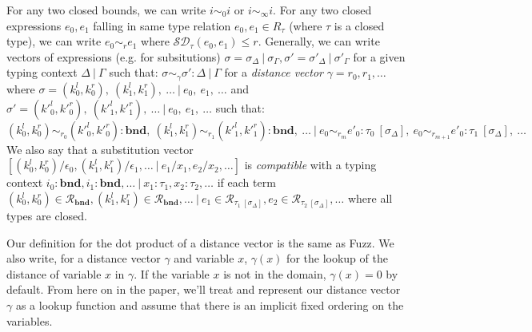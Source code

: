For any two closed bounds, we can write $i \sim_0 i$ or $i \sim_{\infty} i$. 
For any two closed expressions $e_0, e_1$ falling in same type relation $e_0,
e_1 \in R_\tau$ (where $\tau$ is a closed type), we can write $e_0 \sim_r e_1$
where $\mathcal{SD}_{\tau}(e_0, e_1) \leq r$. 
Generally, we can write vectors of expressions (e.g. for subsitutions) $\sigma =
\sigma_{\Delta} \ | \ \sigma_{\Gamma}, \sigma' = \sigma'_{\Delta} \ | \
\sigma'_{\Gamma}$
for a given typing context $\Delta \ | \ \Gamma$ such that: $\sigma \sim_{\gamma} \sigma'
: \Delta \ | \ \Gamma$ for a \textit{distance vector}
$\gamma = r_0, r_1, \ldots$
where
$\sigma = (k^l_0, k^r_0),~(k^l_1, k^r_1),~\ldots \ | \ e_0,~e_1,~\ldots$ 
and 
$\sigma' = (k'^l_0, k'^r_0),~(k'^l_1, k'^r_1),~\ldots \ | \ e_0,~e_1,~\ldots$ 
such that:
$$
(k^l_0, k^r_0) \sim_{r_0} (k'^l_0, k'^r_0) : \mathbf{bnd},~(k^l_1, k^r_1) \sim_{r_1} (k'^l_1, k'^r_1) : \mathbf{bnd},~\ldots \
| \ e_0 \sim_{r_m} e'_0 :
\tau_0~[\sigma_{\Delta}],~e_0 \sim_{r_{m+1}} e'_0 :
\tau_1~[\sigma_{\Delta}],~\ldots
$$
We also say that a substitution vector 
$[(k^l_0, k^r_0) / \epsilon_0, (k^l_1, k^r_1) / \epsilon_1, \ldots \ | \ e_1/x_1, e_2/x_2, \ldots]$ 
is \textit{compatible} with a typing context 
$i_0 : \mathbf{bnd}, i_1 : \mathbf{bnd}, \ldots \ | \ x_1 : \tau_1, x_2 : \tau_2, \ldots$
if each term 
$(k^l_0, k^r_0) \in \mathcal{R}_{\mathbf{bnd}}, 
(k^l_1, k^r_1) \in \mathcal{R}_{\mathbf{bnd}}, 
\ldots \ | 
\ e_1 \in \mathcal{R}_{\tau_1~[\sigma_{\Delta}]}, 
e_2 \in \mathcal{R}_{\tau_2~[\sigma_{\Delta}]}, \ldots$ where all types are closed.

Our definition for the dot product of a distance vector is the same as Fuzz. We
also write, for a distance vector $\gamma$ and variable $x$, $\gamma(x)$ for the
lookup of the distance of variable $x$ in $\gamma$. If the variable $x$ is not
in the domain, $\gamma(x) = 0$ by default. From here on in the paper, we'll
treat and represent our distance vector $\gamma$ as a lookup function and assume
that there is an implicit fixed ordering on the variables.

